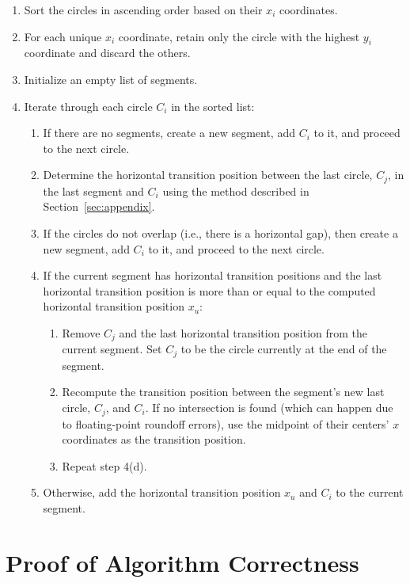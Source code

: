 \documentclass[12pt]{article}
\begin{document}
\begin{enumerate}
    \item Sort the circles in ascending order based on their $x_i$ coordinates.
    \item For each unique $x_i$ coordinate, retain only the circle with the highest $y_i$ coordinate
    and discard the others.
    \item Initialize an empty list of segments.
    \item Iterate through each circle $C_i$ in the sorted list:
    \begin{enumerate}
        \item If there are no segments, create a new segment, add $C_i$ to it, and proceed
        to the next circle.
        \item Determine the horizontal transition position between the last circle, $C_j$, in
        the last segment and $C_i$ using the method described in Section~\ref{sec:appendix}.
        \item If the circles do not overlap (i.e., there is a horizontal gap), then create a
        new segment, add $C_i$ to it, and proceed to the next circle.
        \item If the current segment has horizontal transition positions and the last
        horizontal transition position is more than or equal to the computed
        horizontal transition position $x_u$:
        \begin{enumerate}
            \item Remove $C_j$ and the last horizontal transition position from the
            current segment. Set $C_j$ to be the circle currently at the end of
            the segment.
            \item Recompute the transition position between the segment's new last
            circle, $C_j$, and $C_i$. If no intersection is found (which can happen
            due to floating-point roundoff errors), use the midpoint of their
            centers' $x$ coordinates as the transition position.
            \item Repeat step 4(d).
        \end{enumerate}
        \item Otherwise, add the horizontal transition position $x_u$ and $C_i$ to the current
        segment.
    \end{enumerate}
\end{enumerate}

\section{Proof of Algorithm Correctness}
\end{document}
